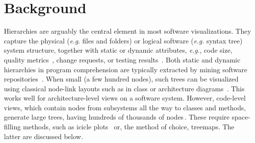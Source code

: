 \section{Background}
\label{sec:init-background}
%
%
Hierarchies are arguably the central element in most software visualizations. They capture the physical (\emph{e.g.} files and folders) or logical software (\emph{e.g.} syntax tree) system structure, together with static or dynamic attributes, \emph{e.g.}, code size, quality metrics~\citep{lanza06}, change requests, or testing results~\citep{diehl08}. Both static and dynamic hierarchies in program comprehension are typically extracted by mining software repositories~\citep{lanza03,kagdi07}.
When small (a few hundred nodes), such trees can be visualized using classical node-link layouts such as in class or architecture diagrams~\citep{muller88,lanza03,telea02}. This works well for architecture-level views on a software system. However, code-level views, which contain nodes from subsystems all the way to classes and methods, generate large trees, having hundreds of thousands of nodes\,\citep{sunburst2}. These require space-filling methods, such as icicle plots~\citep{holten06,cornelissen07} or, the method of choice, treemaps. The latter are discussed below.

